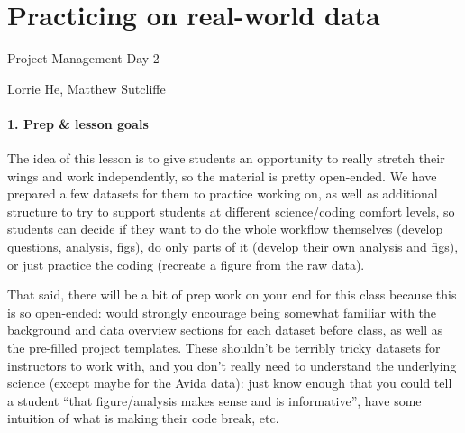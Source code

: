 \documentclass[
  letterpaper,
  DIV=11,
  numbers=noendperiod]{scrreprt}
\begin{document}

\hypertarget{practicing-on-real-world-data}{%
\chapter{Practicing on real-world
data}\label{practicing-on-real-world-data}}

Project Management Day 2

Lorrie He, Matthew Sutcliffe

\hfill\break

\begin{tcolorbox}[enhanced jigsaw, left=2mm, colframe=quarto-callout-note-color-frame, leftrule=.75mm, opacitybacktitle=0.6, toptitle=1mm, title=\textcolor{quarto-callout-note-color}{\faInfo}\hspace{0.5em}{Instructor notes}, opacityback=0, coltitle=black, colbacktitle=quarto-callout-note-color!10!white, breakable, colback=white, titlerule=0mm, bottomrule=.15mm, arc=.35mm, bottomtitle=1mm, rightrule=.15mm, toprule=.15mm]

\hypertarget{prep-lesson-goals}{%
\subsubsection{1. Prep \& lesson goals}\label{prep-lesson-goals}}

The idea of this lesson is to give students an opportunity to really
stretch their wings and work independently, so the material is pretty
open-ended. We have prepared a few datasets for them to practice working
on, as well as additional structure to try to support students at
different science/coding comfort levels, so students can decide if they
want to do the whole workflow themselves (develop questions, analysis,
figs), do only parts of it (develop their own analysis and figs), or
just practice the coding (recreate a figure from the raw data).

That said, there will be a bit of prep work on your end for this class
because this is so open-ended: would strongly encourage being somewhat
familiar with the background and data overview sections for each dataset
before class, as well as the pre-filled project templates. These
shouldn't be terribly tricky datasets for instructors to work with, and
you don't really need to understand the underlying science (except maybe
for the Avida data): just know enough that you could tell a student
``that figure/analysis makes sense and is informative'', have some
intuition of what is making their code break, etc.


\end{tcolorbox}
\end{document}
